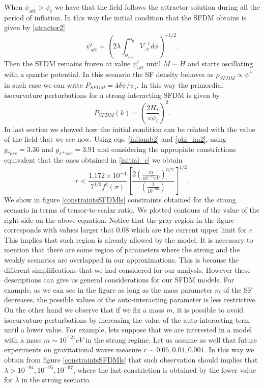 \documentclass[amssymb,twocolumn,prd,nofootinbib,showpacs]{revtex4-1}
\begin{document}
When $\psi_{att}>\psi_t$ we have that the field follows the attractor solution during all the period of inflation. In this way the initial condition that the SFDM obtains is given by \eqref{atractor2}
\begin{equation}\label{atractor3}
\psi_{att}^i = \left(2\lambda\int_{\phi_{end}}^{\phi_0}V^{-1}_{,\phi}d\phi\right)^{-1/2}.
\end{equation}
Then the SFDM remains frozen at value $\psi_{att}^i$ until $M\sim H$ and starts oscillating with a quartic potential. In this scenario the SF density behaves as $\rho_{SFDM}\propto \psi^4$ in such case we can write $P_{SFDM}=4\delta\psi/\psi_i$. In this way the primordial isocurvature perturbations for a strong-interacting SFDM is given by
\begin{equation}
P_{SFDM}(k)=\left(\frac{2H_*}{\pi\psi_i}\right)^2.
\end{equation}
In last section we showed how the initial condition can be related with the value of the field that we see now. Using eqs. \eqref{inilamb2} and \eqref{phi_im2}, using $g_{*osc}=3.36$ and $g_{s*osc}=3.91$  and considering the appropiate constrictions equivalent that the ones obtained in \eqref{initial_c} we obtain
\begin{equation}\label{constr4}
r<\frac{1.172\times 10^{-4}}{7^{1/3}f^2(\sigma)}\left[\frac{2\left(\frac{m}{10^{-22}eV}\right)^{3/2}}{\left(\frac{\lambda}{10^{-96}}\right)}\right]^{1/2}.
\end{equation}
We show in figure \ref{constraintsSFDMls} constraints obtained for the strong scenario in terms of tensor-to-scalar ratio. We plotted contours of the value of the right side on the above equation. Notice that the gray region in the figure corresponds with values larger that $0.08$ which are the current upper limit for $r$. This implies that such region is already allowed by the model. It is necessary to mention that there are some region of parameters where the strong and the weakly scenarios are overlapped in our approximations. This is because the different simplifications that we had considered for our analysis. However these descriptions can give us general considerations for our SFDM models. For example, as we can see in the figure as long as the mass parameter $m$ of the SF decreases, the possible values of the auto-interacting parameter is less restrictive. On the other hand we observe that if we fix a mass $m$, it is possible to avoid isocurvature perturbations by increasing the value of the auto-interacting term until a lower value. For example, lets suppose that we are interested in a model with a mass $m\sim 10^{-21} eV$ in the strong regime. Let us assume as well that future experiments on gravitational waves measure $r\sim 0.05,0.01,0.001$. In this way we obtain from figure \ref{constraintsSFDMls} that such observation should implies that $\lambda>10^{-94},10^{-95},10^{-97}$, where the last constriction is obtained by the lower value for $\lambda$ in the strong scenario.   
\end{document}
